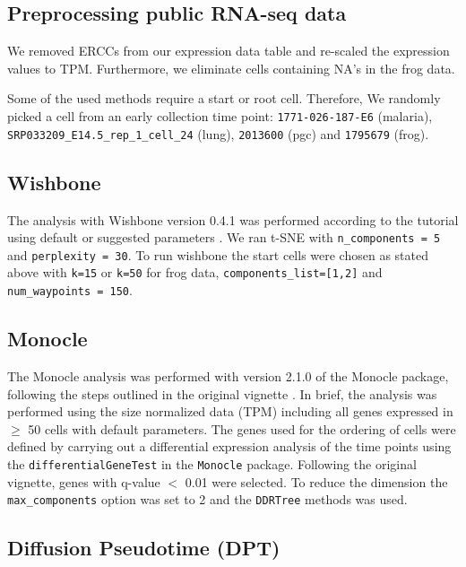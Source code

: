 \subsection{Preprocessing public RNA-seq data}

We removed ERCCs from our expression data table and re-scaled the expression values to TPM. Furthermore, we eliminate cells containing NA's in the frog data.

Some of the used methods require a start or root cell. Therefore, We randomly picked a cell from an early collection time point: \texttt{1771-026-187-E6} (malaria), \texttt{SRP033209\_E14.5\_rep\_1\_cell\_24} (lung), \texttt{2013600} (pgc) and \texttt{1795679} (frog).

\subsection{Wishbone}

The analysis with Wishbone version 0.4.1 was performed according to the tutorial using default or suggested parameters \cite{Setty2016-ie}. We ran t-SNE with \texttt{n\_components = 5} and \texttt{perplexity = 30}. To run wishbone the start cells were chosen as  stated above with \texttt{k=15} or \texttt{k=50} for frog data, \texttt{components\_list=[1,2]} and \texttt{num\_waypoints = 150}.

\subsection{Monocle}

The Monocle analysis was performed with version 2.1.0 of the Monocle package, following the steps outlined in the original vignette \cite{Trapnell2014-cn}. In brief, the analysis was  performed using the size normalized data (TPM) including all genes expressed in $ \geq $ 50 cells with default parameters. The genes used for the ordering of cells were defined by carrying out a differential expression analysis of the time points using the \texttt{differentialGeneTest} in the \texttt{Monocle} package. Following the original vignette, genes with q-value $<$ 0.01 were selected. To reduce the dimension the \texttt{max\_components} option was set to 2 and the \texttt{DDRTree} methods was used.

\subsection{Diffusion Pseudotime (DPT)}


